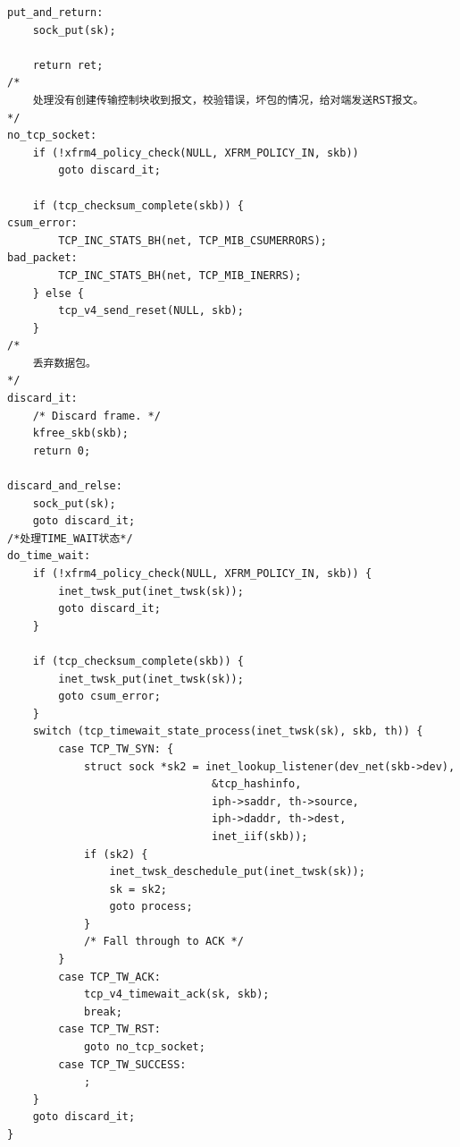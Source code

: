 \begin{verbatim}
put_and_return:
    sock_put(sk);

    return ret;
/*
    处理没有创建传输控制块收到报文，校验错误，坏包的情况，给对端发送RST报文。
*/
no_tcp_socket:
    if (!xfrm4_policy_check(NULL, XFRM_POLICY_IN, skb))
        goto discard_it;

    if (tcp_checksum_complete(skb)) {
csum_error:
        TCP_INC_STATS_BH(net, TCP_MIB_CSUMERRORS);
bad_packet:
        TCP_INC_STATS_BH(net, TCP_MIB_INERRS);
    } else {
        tcp_v4_send_reset(NULL, skb);
    }
/*
    丢弃数据包。    
*/
discard_it:
    /* Discard frame. */
    kfree_skb(skb);
    return 0;

discard_and_relse:
    sock_put(sk);
    goto discard_it;
/*处理TIME_WAIT状态*/
do_time_wait:
    if (!xfrm4_policy_check(NULL, XFRM_POLICY_IN, skb)) {
        inet_twsk_put(inet_twsk(sk));
        goto discard_it;
    }

    if (tcp_checksum_complete(skb)) {
        inet_twsk_put(inet_twsk(sk));
        goto csum_error;
    }
    switch (tcp_timewait_state_process(inet_twsk(sk), skb, th)) {
        case TCP_TW_SYN: {
            struct sock *sk2 = inet_lookup_listener(dev_net(skb->dev),
                                &tcp_hashinfo,
                                iph->saddr, th->source,
                                iph->daddr, th->dest,
                                inet_iif(skb));
            if (sk2) {
                inet_twsk_deschedule_put(inet_twsk(sk));
                sk = sk2;
                goto process;
            }
            /* Fall through to ACK */
        }
        case TCP_TW_ACK:
            tcp_v4_timewait_ack(sk, skb);
            break;
        case TCP_TW_RST:
            goto no_tcp_socket;
        case TCP_TW_SUCCESS:
            ;
    }
    goto discard_it;
}
\end{verbatim}

